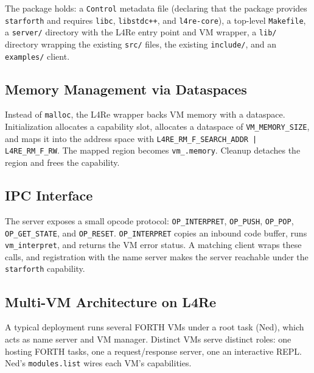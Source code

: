 The package holds: a \texttt{Control} metadata file (declaring that
the package provides \texttt{starforth} and requires \texttt{libc},
\texttt{libstdc++}, and \texttt{l4re-core}), a top-level \texttt{Makefile},
a \texttt{server/} directory with the L4Re entry point and VM wrapper, a
\texttt{lib/} directory wrapping the existing \texttt{src/} files, the
existing \texttt{include/}, and an \texttt{examples/} client.

\subsection{Memory Management via Dataspaces}

Instead of \texttt{malloc}, the L4Re wrapper backs VM memory with a
dataspace. Initialization allocates a capability slot, allocates a
dataspace of \texttt{VM\_MEMORY\_SIZE}, and maps it into the address space
with \texttt{L4RE\_RM\_F\_SEARCH\_ADDR | L4RE\_RM\_F\_RW}. The mapped
region becomes \texttt{vm\_.memory}. Cleanup detaches the region and frees
the capability.

\subsection{IPC Interface}

The server exposes a small opcode protocol: \texttt{OP\_INTERPRET},
\texttt{OP\_PUSH}, \texttt{OP\_POP}, \texttt{OP\_GET\_STATE}, and
\texttt{OP\_RESET}. \texttt{OP\_INTERPRET} copies an inbound code buffer,
runs \texttt{vm\_interpret}, and returns the VM error status. A matching
client wraps these calls, and registration with the name server makes the
server reachable under the \texttt{starforth} capability.

\subsection{Multi-VM Architecture on L4Re}

A typical deployment runs several FORTH VMs under a root task (Ned), which
acts as name server and VM manager. Distinct VMs serve distinct roles:
one hosting FORTH tasks, one a request/response server, one an interactive
REPL. Ned's \texttt{modules.list} wires each VM's capabilities.


